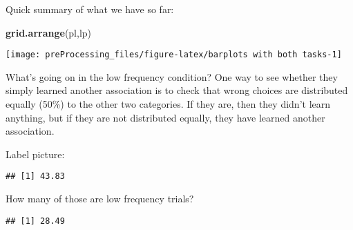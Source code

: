 \documentclass[
]{article}
\newenvironment{Shaded}{\begin{snugshade}}{\end{snugshade}}
\newcommand{\CommentTok}[1]{\textcolor[rgb]{0.56,0.35,0.01}{\textit{#1}}}
\newcommand{\DecValTok}[1]{\textcolor[rgb]{0.00,0.00,0.81}{#1}}
\newcommand{\KeywordTok}[1]{\textcolor[rgb]{0.13,0.29,0.53}{\textbf{#1}}}
\newcommand{\NormalTok}[1]{#1}
\newcommand{\OperatorTok}[1]{\textcolor[rgb]{0.81,0.36,0.00}{\textbf{#1}}}
\newcommand{\StringTok}[1]{\textcolor[rgb]{0.31,0.60,0.02}{#1}}
\begin{document}
Quick summary of what we have so far:

\begin{Shaded}
\begin{Highlighting}[]
\KeywordTok{grid.arrange}\NormalTok{(pl,lp)}
\end{Highlighting}
\end{Shaded}

\begin{center}\texttt{[image: preProcessing\_files/figure-latex/barplots with both tasks-1]} \end{center}

What's going on in the low frequency condition? One way to see whether
they simply learned another association is to check that wrong choices
are distributed equally (50\%) to the other two categories. If they are,
then they didn't learn anything, but if they are not distributed
equally, they have learned another association.

Label picture:

\begin{Shaded}
\end{Shaded}

\begin{verbatim}
## [1] 43.83
\end{verbatim}

How many of those are low frequency trials?

\begin{Shaded}
\end{Shaded}

\begin{verbatim}
## [1] 28.49
\end{verbatim}
\end{document}
